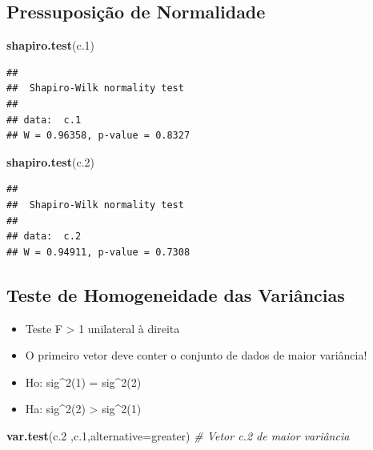 \documentclass[
]{book}
\newenvironment{Shaded}{\begin{snugshade}}{\end{snugshade}}
\newcommand{\AttributeTok}[1]{\textcolor[rgb]{0.13,0.29,0.53}{#1}}
\newcommand{\CommentTok}[1]{\textcolor[rgb]{0.56,0.35,0.01}{\textit{#1}}}
\newcommand{\FloatTok}[1]{\textcolor[rgb]{0.00,0.00,0.81}{#1}}
\newcommand{\FunctionTok}[1]{\textcolor[rgb]{0.13,0.29,0.53}{\textbf{#1}}}
\newcommand{\NormalTok}[1]{#1}
\newcommand{\StringTok}[1]{\textcolor[rgb]{0.31,0.60,0.02}{#1}}
\providecommand{\tightlist}{%
  \setlength{\itemsep}{0pt}\setlength{\parskip}{0pt}}
\begin{document}
\subsection{Pressuposição de Normalidade}\label{pressuposiuxe7uxe3o-de-normalidade-1}

\begin{Shaded}
\begin{Highlighting}[]
\FunctionTok{shapiro.test}\NormalTok{(c}\FloatTok{.1}\NormalTok{)}
\end{Highlighting}
\end{Shaded}

\begin{verbatim}
## 
##  Shapiro-Wilk normality test
## 
## data:  c.1
## W = 0.96358, p-value = 0.8327
\end{verbatim}

\begin{Shaded}
\begin{Highlighting}[]
\FunctionTok{shapiro.test}\NormalTok{(c}\FloatTok{.2}\NormalTok{)}
\end{Highlighting}
\end{Shaded}

\begin{verbatim}
## 
##  Shapiro-Wilk normality test
## 
## data:  c.2
## W = 0.94911, p-value = 0.7308
\end{verbatim}

\subsection{Teste de Homogeneidade das Variâncias}\label{teste-de-homogeneidade-das-variuxe2ncias-1}

\begin{itemize}
\tightlist
\item
  Teste F \textgreater{} 1 unilateral à direita
\item
  O primeiro vetor deve conter o conjunto de dados de maior variância!
\item
  Ho: sig\^{}2(1) = sig\^{}2(2)
\item
  Ha: sig\^{}2(2) \textgreater{} sig\^{}2(1)
\end{itemize}

\begin{Shaded}
\begin{Highlighting}[]
\FunctionTok{var.test}\NormalTok{(c}\FloatTok{.2}\NormalTok{ ,c}\FloatTok{.1}\NormalTok{,}\AttributeTok{alternative=}\StringTok{\textquotesingle{}greater\textquotesingle{}}\NormalTok{) }\CommentTok{\# Vetor c.2 de maior variância}
\end{Highlighting}
\end{Shaded}
\end{document}
